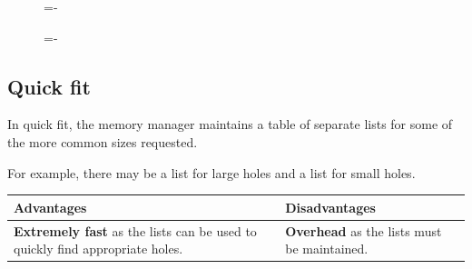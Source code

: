 \documentclass[a4paper]{systems-software}
\begin{document}
\begin{figure}[H]
  \lineskip=-\fboxrule
\end{figure}

\begin{figure}[H]
  \lineskip=-\fboxrule
\end{figure}


\subsection*{Quick fit}

In quick fit, the memory manager maintains a table of separate lists for some of the more common sizes requested.

For example, there may be a list for large holes and a list for small holes.

\begin{longtabu} to \textwidth {| X[1,l] | X[1,l] |}
    \hline
    \textbf{Advantages} & \textbf{Disadvantages}
	\\ \hline
	\textbf{Extremely fast} as the lists can be used to quickly find appropriate holes. &
	\textbf{Overhead} as the lists must be maintained.
	\\ \hline
\end{longtabu}
\end{document}
